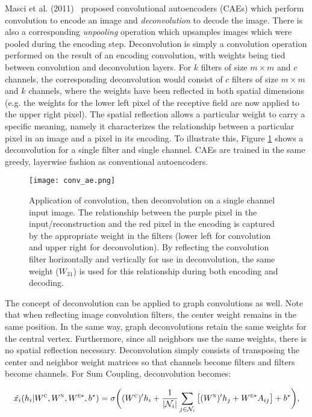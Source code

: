 Masci et al. (2011)~\cite{masci2011} proposed convolutional autoencoders (CAEs) which perform convolution to encode an image and \emph{deconvolution} to decode the image.
There is also a corresponding \emph{unpooling} operation which upsamples images which were pooled during the encoding step.
Deconvolution is simply a convolution operation performed on the result of an encoding convolution, with weights being tied between convolution and deconvolution layers.
For $k$ filters of size $m \times m$ and $c$ channels, the corresponding deconvolution would consist of $c$ filters of size $m \times m$ and $k$ channels, where the weights have been reflected in both spatial dimensions (e.g. the weights for the lower left pixel of the receptive field are now applied to the upper right pixel).
The spatial reflection allows a particular weight to carry a specific meaning, namely it characterizes the relationship between a particular pixel in an image and a pixel in its encoding.
To illustrate this, Figure \ref{fig:deconv} shows a deconvolution for a single filter and single channel.
CAEs are trained in the same greedy, layerwise fashion as conventional autoencoders.

\begin{figure}
	\texttt{[image: conv\_ae.png]}
	\caption{Application of convolution, then deconvolution on a single channel input image. The relationship between the purple pixel in the input/reconstruction and the red pixel in the encoding is captured by the appropriate weight in the filters (lower left for convolution and upper right for deconvolution). By reflecting the convolution filter horizontally and vertically for use in deconvolution, the same weight ($W_{31}$) is used for this relationship during both encoding and decoding.
		\label{fig:deconv}}
\end{figure}


The concept of deconvolution can be applied to graph convolutions as well.
Note that when reflecting image convolution filters, the center weight remains in the same position.
In the same way, graph deconvolutions retain the same weights for the central vertex. 
Furthermore, since all neighbors use the same weights, there is no spatial reflection necessary.
Deconvolution simply consists of transposing the center and neighbor weight matrices so that channels become filters and filters become channels.
For Sum Coupling, deconvolution becomes:

\begin{equation}
\hat{x_i}(h_i | W^\textsc{c}, W^\textsc{n}, W^{\textsc{e}*}, b^*) = \sigma \bigg( (W^{\textsc{c}})' h_i + \frac{1}{|\mathcal{N}_i|}\sum_{j \in \mathcal{N}_i} \big[ (W^{\textsc{n}})' h_j + W^{\textsc{e}*} A_{ij} \big] + b^* \bigg),
\label{eq:sum_deconv}
\end{equation}

